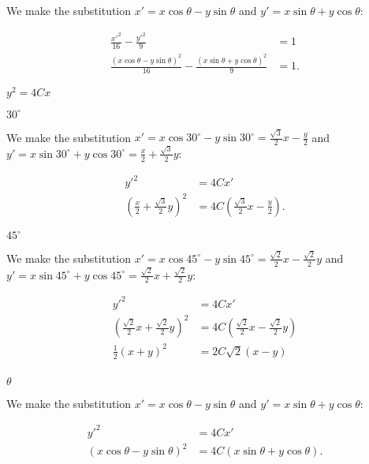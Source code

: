 \documentclass[../gatm_answers.tex]{subfiles}
\begin{document}
We make the substitution $x'=x \cos \theta - y\sin \theta$ and $y'=x\sin \theta + y\cos \theta$:

\begin{align*}
\frac{x'^2}{16}-\frac{y'^2}{9} &= 1 \\
\frac{\left(x \cos \theta - y\sin \theta\right)^2}{16} - \frac{\left(x\sin \theta + y\cos \theta\right)^2}{9} &= 1.
\end{align*}

\begin{inner_problem}
\item $y^2=4Cx$
\end{inner_problem}

\begin{iinner_problem}[start=1]
\item $30^\circ$
\end{iinner_problem}

We make the substitution $x'=x \cos 30^\circ - y\sin 30^\circ=\frac{\sqrt{3}}{2}x-\frac{y}{2}$ and $y'=x\sin 30^\circ + y\cos 30^\circ=\frac{x}{2}+\frac{\sqrt{3}}{2}y$:

\begin{align*}
y'^2&=4Cx' \\
\left(\frac{x}{2}+\frac{\sqrt{3}}{2}y\right)^2 &= 4C\left(\frac{\sqrt{3}}{2}x-\frac{y}{2}\right).
\end{align*}

\begin{iinner_problem}
\item $45^\circ$
\end{iinner_problem}

We make the substitution $x'=x \cos 45^\circ - y\sin 45^\circ=\frac{\sqrt{2}}{2}x-\frac{\sqrt{2}}{2}y$ and $y'=x\sin 45^\circ + y\cos 45^\circ=\frac{\sqrt{2}}{2}x+\frac{\sqrt{2}}{2}y$:

\begin{align*}
y'^2&=4Cx' \\
\left(\frac{\sqrt{2}}{2}x+\frac{\sqrt{2}}{2}y\right)^2 &= 4C\left(\frac{\sqrt{2}}{2}x-\frac{\sqrt{2}}{2}y\right) \\
\frac{1}{2}(x+y)^2 &= 2C\sqrt{2}(x-y) \\
\end{align*}

\begin{iinner_problem}
\item $\theta$
\end{iinner_problem}

We make the substitution $x'=x \cos \theta - y\sin \theta$ and $y'=x\sin \theta + y\cos \theta$:

\begin{align*}
y'^2&=4Cx' \\
\left(x \cos \theta - y\sin \theta\right)^2 &= 4C\left(x\sin \theta + y\cos \theta\right).
\end{align*}
\end{document}

